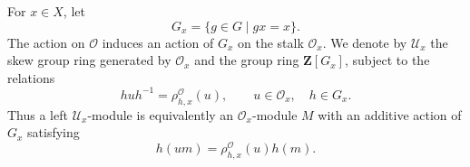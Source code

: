 \begin{definition}
\label{definition-stabilizer-skew-group-ring}
\begin{reference}
\cite[Chapter V, \S 5.1, p. 197]{Tohoku}
\end{reference}
For $x \in X$, let
$$
G_x=\{g\in G\mid gx=x\}.
$$
The action on $\mathcal{O}$ induces an action of $G_x$ on the stalk
$\mathcal{O}_x$. We denote by $\mathcal{U}_x$ the skew group ring
generated by $\mathcal{O}_x$ and the group ring
$\mathbf{Z}[G_x]$, subject to the relations
$$
huh^{-1}=\rho^\mathcal{O}_{h,x}(u),
\qquad
u\in\mathcal{O}_x,\quad h\in G_x.
$$
Thus a left $\mathcal{U}_x$-module is equivalently an
$\mathcal{O}_x$-module $M$ with an additive action of $G_x$ satisfying
$$
h(um)=\rho^\mathcal{O}_{h,x}(u)h(m).
$$
\end{definition}

